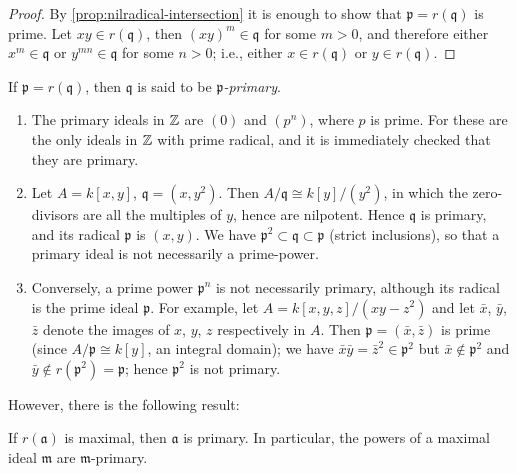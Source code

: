 \begin{proof}
    By \eqref{prop:nilradical-intersection} it is enough to show that $\mathfrak{p} = r(\mathfrak{q})$ is prime. Let $xy \in r(\mathfrak{q})$, then $(xy)^m \in \mathfrak{q}$ for some $m > 0$, and therefore either $x^m \in \mathfrak{q}$ or $y^{mn} \in \mathfrak{q}$ for some $n > 0$; i.e., either $x \in r(\mathfrak{q})$ or $y \in r(\mathfrak{q})$.
\end{proof}

If $\mathfrak{p} = r(\mathfrak{q})$, then $\mathfrak{q}$ is said to be \emph{$\mathfrak{p}$-primary}.

\begin{examples}
    \begin{enumerate}[(1)]
        \item The primary ideals in $\mathbb{Z}$ are $(0)$ and $(p^n)$, where $p$ is prime. For these are the only ideals in $\mathbb{Z}$ with prime radical, and it is immediately checked that they are primary.
        
        \item Let $A = k[x, y]$, $\mathfrak{q} = (x, y^2)$. Then $A/\mathfrak{q} \cong k[y]/(y^2)$, in which the zero-divisors are all the multiples of $y$, hence are nilpotent. Hence $\mathfrak{q}$ is primary, and its radical $\mathfrak{p}$ is $(x, y)$. We have $\mathfrak{p}^2 \subset \mathfrak{q} \subset \mathfrak{p}$ (strict inclusions), so that a primary ideal is not necessarily a prime-power.
        
        \item Conversely, a prime power $\mathfrak{p}^n$ is not necessarily primary, although its radical is the prime ideal $\mathfrak{p}$. For example, let $A = k[x, y, z]/(xy - z^2)$ and let $\bar{x}$, $\bar{y}$, $\bar{z}$ denote the images of $x$, $y$, $z$ respectively in $A$. Then $\mathfrak{p} = (\bar{x}, \bar{z})$ is prime (since $A/\mathfrak{p} \cong k[y]$, an integral domain); we have $\bar{x}\bar{y} = \bar{z}^2 \in \mathfrak{p}^2$ but $\bar{x} \notin \mathfrak{p}^2$ and $\bar{y} \notin r(\mathfrak{p}^2) = \mathfrak{p}$; hence $\mathfrak{p}^2$ is not primary.
    \end{enumerate}
\end{examples}

However, there is the following result:

\begin{proposition}\label{prop:radical-maximal}
    If $r(\mathfrak{a})$ is maximal, then $\mathfrak{a}$ is primary. In particular, the powers of a maximal ideal $\mathfrak{m}$ are $\mathfrak{m}$-primary.
\end{proposition}

